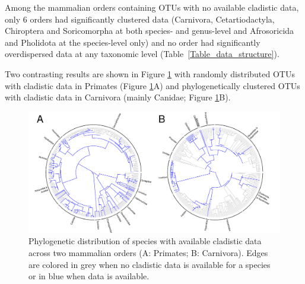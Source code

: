 \documentclass[12pt,letterpaper]{article}
\begin{document}


Among the mammalian orders containing OTUs with no available cladistic data, only 6 orders had significantly clustered data (Carnivora, Cetartiodactyla, Chiroptera and Soricomorpha at both species- and genus-level and Afrosoricida and Pholidota at the species-level only) and no order had significantly overdispersed data at any taxonomic level (Table~\ref{Table_data_structure}).

Two contrasting results are shown in Figure \ref{Figure_example_coverage} with randomly distributed OTUs with cladistic data in Primates (Figure \ref{Figure_example_coverage}A) and phylogenetically clustered OTUs with cladistic data in Carnivora (mainly Canidae; Figure \ref{Figure_example_coverage}B).

\begin{figure}[!htbp]
\centering
    \includegraphics[width=1\textwidth]{example_coverage.pdf}
\caption{Phylogenetic distribution of species with available cladistic data across two mammalian orders (A: Primates; B: Carnivora).
Edges are colored in grey when no cladistic data is available for a species or in blue when data is available.}
\label{Figure_example_coverage}
\end{figure}

%
%
\end{document}
